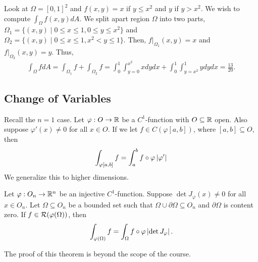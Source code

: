 \begin{example}
    Look at $\Omega = [0,1]^{2}$ and $f(x,y) = x$ if $y \leq x^{2}$ and $y$ if $y > x^{2}$. We wish to compute $\int_{\Omega} f(x,y) dA$. We split apart region $\Omega$ into two parts, $\Omega_{1} = \{(x,y) \mid 0 \leq x \leq 1, 0 \leq y \leq x^{2}\}$ and $\Omega_{2} = \{(x,y) \mid 0 \leq x \leq 1, x^{2} < y \leq 1\}$. Then, $f|_{\Omega_{1}}(x,y) = x$ and $f|_{\Omega_{2}}(x,y) = y$. Thus,
    \begin{align}
        \int_{\Omega} f dA = \int_{\Omega_{1}} f + \int_{\Omega_{2}} f = \int_{0}^{1} \int_{y=0}^{x^{2}} x dy dx + \int_{0}^{1} \int_{y=x^{2}}^{1} y dy dx = \frac{13}{20}.
    \end{align}
\end{example}

\subsection{Change of Variables}

Recall the $n = 1$ case. Let $\varphi: O \to \mathbb{R}$ be a $C^{1}$-function with $O \subseteq \mathbb{R}$ open. Also suppose $\varphi'(x) \neq 0$ for all $x \in O$. If we let $f \in C(\varphi[a,b])$, where $[a,b] \subseteq O$, then
\begin{align}
    \int_{\varphi[a,b]} f = \int_{a}^{b} f \circ \varphi \left| \varphi' \right|
\end{align}
We generalize this to higher dimensions.

\begin{theorem}
    Let $\varphi:O_{n} \to \mathbb{R}^{n}$ be an injective $C^{1}$-function. Suppose $\det J_{\varphi}(x) \neq 0$ for all $x \in O_{n}$. Let $\Omega \subseteq O_{n}$ be a bounded set such that $\Omega \cup \partial \Omega \subseteq O_{n}$ and $\partial \Omega$ is content zero. If $f \in \mathcal{R}(\varphi(\Omega))$, then
    \begin{align}
        \int_{\varphi(\Omega)} f = \int_{\Omega} f \circ \varphi \left| \det J_{\varphi} \right|.
    \end{align}
\end{theorem}
The proof of this theorem is beyond the scope of the course.

